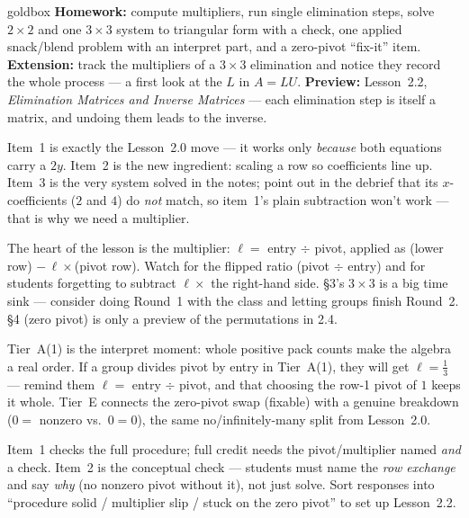 \documentclass[10pt]{article}
\begin{document}
\begin{skillbox}{goldbox}
\textbf{Homework:} compute multipliers, run single elimination steps, solve $2\times 2$ and one
$3\times 3$ system to triangular form with a check, one applied snack/blend problem with an
interpret part, and a zero-pivot ``fix-it'' item. \textbf{Extension:} track the multipliers of a
$3\times 3$ elimination and notice they record the whole process --- a first look at the $L$ in
$A=LU$. \textbf{Preview:} Lesson~2.2, \emph{Elimination Matrices and Inverse Matrices} --- each
elimination step is itself a matrix, and undoing them leads to the inverse.
\end{skillbox}

\begin{teachernote}[Warm-Up]
Item~1 is exactly the Lesson~2.0 move --- it works only \emph{because} both equations carry a
$2y$. Item~2 is the new ingredient: scaling a row so coefficients line up. Item~3 is the very
system solved in the notes; point out in the debrief that its $x$-coefficients ($2$ and $4$) do
\emph{not} match, so item~1's plain subtraction won't work --- that is why we need a multiplier.
\end{teachernote}

\begin{teachernote}
The heart of the lesson is the multiplier: $\ell=$ entry $\div$ pivot, applied as (lower row)
$-\,\ell\times$(pivot row). Watch for the flipped ratio (pivot $\div$ entry) and for students
forgetting to subtract $\ell\times$ the right-hand side. \S3's $3\times3$ is a big time sink ---
consider doing Round~1 with the class and letting groups finish Round~2. \S4 (zero pivot) is only a
preview of the permutations in 2.4.
\end{teachernote}

\begin{teachernote}
Tier~A(1) is the interpret moment: whole positive pack counts make the algebra a real order. If a
group divides pivot by entry in Tier~A(1), they will get $\ell=\tfrac13$ --- remind them $\ell=$
entry $\div$ pivot, and that choosing the row-1 pivot of $1$ keeps it whole. Tier~E connects the
zero-pivot swap (fixable) with a genuine breakdown ($0=$ nonzero vs.\ $0=0$), the same
no/infinitely-many split from Lesson~2.0.
\end{teachernote}

\begin{teachernote}
Item~1 checks the full procedure; full credit needs the pivot/multiplier named \emph{and} a check.
Item~2 is the conceptual check --- students must name the \emph{row exchange} and say \emph{why}
(no nonzero pivot without it), not just solve. Sort responses into ``procedure solid / multiplier
slip / stuck on the zero pivot'' to set up Lesson~2.2.
\end{teachernote}
\end{document}
